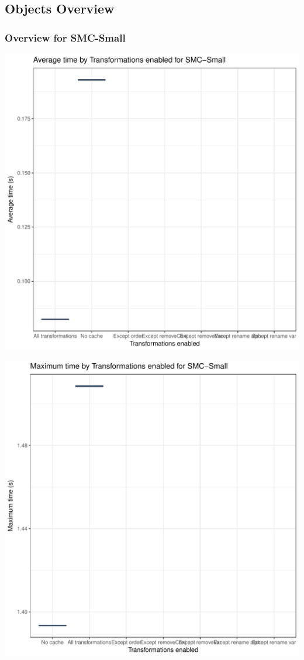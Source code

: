 \documentclass{article}\usepackage[]{graphicx}\usepackage[]{color}
\makeatletter
\def\maxwidth{ %
  \ifdim\Gin@nat@width>\linewidth
    \linewidth
  \else
    \Gin@nat@width
  \fi
}
\newenvironment{knitrout}{}{} %
\makeatother
\begin{document}
\subsection{Objects Overview}
\subsubsection{Overview for SMC-Small}
\begin{knitrout}
\color{fgcolor}
\includegraphics[width=\maxwidth]{figure/small-1} 

\includegraphics[width=\maxwidth]{figure/small-2} 


\end{knitrout}
\end{document}
